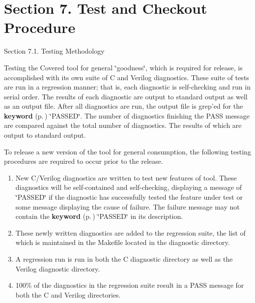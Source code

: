 \section{Section 7.  Test and Checkout Procedure}\label{page_testing}
 \begin{Desc}
\item[Section 7.1.  Testing Methodology]\par
 Testing the Covered tool for general \char`\"{}goodness\char`\"{}, which is required for release, is  accomplished with its own suite of C and Verilog diagnostics. These suite of tests are run  in a regression manner; that is, each diagnostic is self-checking and run in serial order.  The results of each diagnostic are output to standard output as well as an output file. After all diagnostics are run, the output file is grep'ed for the {\bf keyword} {\rm (p.\,\pageref{structkeyword})} \char`\"{}PASSED\char`\"{}. The number of diagnostics finishing the PASS message are compared against the total number of diagnostics. The results of which are output to standard output.

 To release a new version of the tool for general consumption, the following testing procedures are required to occur prior to the release.\begin{enumerate}
\item 
New C/Verilog diagnostics are written to test new features of tool. These diagnostics will be self-contained and self-checking, displaying a message of \char`\"{}PASSED\char`\"{} if the diagnostic has successfully tested the feature under test or some message displaying the cause of failure. The failure message may not contain the {\bf keyword} {\rm (p.\,\pageref{structkeyword})} \char`\"{}PASSED\char`\"{} in its description.\item 
These newly written diagnostics are added to the regression suite, the list of which is maintained in the Makefile located in the diagnostic directory.\item 
A regression run is run in both the C diagnostic directory as well as the Verilog diagnostic directory.\item 
100\% of the diagnostics in the regression suite result in a PASS message for both the C and Verilog directories.\end{enumerate}
\end{Desc}


